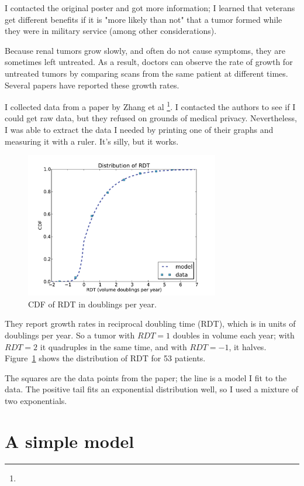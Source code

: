 \documentclass[12pt]{book}
\begin{document}
I contacted the original poster and got more information; I learned
that veterans get different benefits if it is "more likely than not"
that a tumor formed while they were in military service (among other
considerations).

Because renal tumors grow slowly, and often do not cause symptoms,
they are sometimes left untreated.  As a result, doctors can observe
the rate of growth for untreated tumors by comparing scans from the
same patient at different times.  Several papers have reported these
growth rates.

I collected data from a paper by Zhang et al \footnote{}.  I contacted the
authors to see if I could get raw data, but they refused on grounds of
medical privacy.  Nevertheless, I was able to extract the data I
needed by printing one of their graphs and measuring it with a ruler.
It's silly, but it works.

\begin{figure}
\centerline{\includegraphics[height=2.5in]{figs/kidney2.pdf}}
\caption{CDF of RDT in doublings per year.}
\label{fig.kidney2}
\end{figure}

They report growth rates in reciprocal doubling time (RDT),
which is in units of doublings per year.  So a tumor with $RDT=1$
doubles in volume each year; with $RDT=2$ it quadruples in the same
time, and with $RDT=-1$, it halves.  Figure~\ref{fig.kidney2} shows the
distribution of RDT for 53 patients.

The squares are the data points from the paper; the line is a model I
fit to the data.  The positive tail fits an exponential distribution
well, so I used a mixture of two exponentials.


\section{A simple model}
\end{document}
